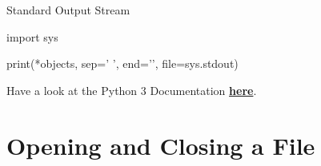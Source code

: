 \documentclass[
  american,
  ignorenonframetext,
]{beamer}
\begin{document}
\begin{frame}{Standard Output Stream}
\protect\hypertarget{standard-output-stream}{}

\begin{pythoncode}

import sys

print(*objects, sep=' ', end='\n', file=sys.stdout)

\end{pythoncode}

Have a look at the Python 3 Documentation
\href{https://docs.python.org/3/library/functions.html\#print}{\textbf{here}}.


\end{frame}

\hypertarget{opening-and-closing-a-file}{%
\section{Opening and Closing a File}\label{opening-and-closing-a-file}}
\end{document}
